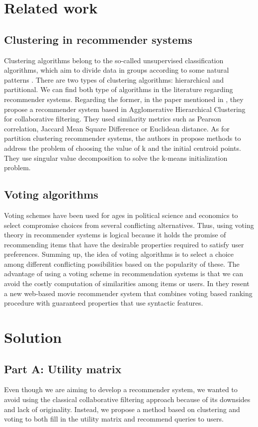 \documentclass[sigconf]{acmart}
\begin{document}
\section{Related work}
\subsection{Clustering in recommender systems}
Clustering algorithms belong to the so-called unsupervised classification algorithms, which aim to divide data in groups according to some natural patterns \cite{phdthesis}. There are two types of clustering algorithms: hierarchical and partitional. We can find both type of algorithms in the literature regarding recommender systems. Regarding the former, in the paper mentioned in \cite{hclustering}, they propose a recommender system  based in Agglomerative Hierarchical Clustering for collaborative filtering. They used similarity metrics such as Pearson correlation,  Jaccard Mean Square Difference or Euclidean distance. As for partition clustering recommender systems, the authors in \cite{kmeanscf} propose methods to address the problem of choosing the value of k and the initial centroid points. They use singular value decomposition to solve the k-means initialization problem.  


\subsection{Voting algorithms}
Voting schemes have been used for ages in political science and economics to select compromise choices from several conﬂicting alternatives. Thus, using voting theory in recommender systems is logical because it  holds the promise of recommending items  that have the desirable properties required to satisfy user preferences. Summing up, the idea of voting algorithms is to select a choice among different conflicting possibilities based on the popularity of these. The advantage of using a voting scheme in recommendation systems is that we can avoid the costly computation of similarities among items or users. In \cite{movies2go} they resent a new web-based movie recommender system that combines voting based ranking procedure with guaranteed properties that use syntactic features.

\section{Solution}
\subsection{Part A: Utility matrix}
Even though we are aiming to develop a recommender system, we wanted to avoid using the classical collaborative filtering approach because of its downsides and lack of originality. Instead, we propose a method based on clustering and voting to both fill in the utility matrix and recommend queries to users.  
\end{document}
